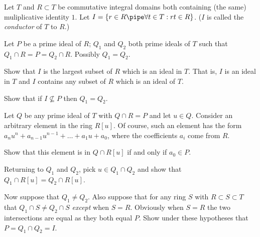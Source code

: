 Let $T$ and $R\subset T$ be commutative integral domains both
containing (the same) muliplicative identity $1$. Let $I=\{r\in R\pipe
\forall t\in T: rt\in R\}$. ($I$ is called the \emph{conductor} of $T$
to $R$.)

Let $P$ be a prime ideal of $R$; $Q_1$ and $Q_2$ both prime ideals of
$T$ such that $Q_1\cap R=P=Q_2\cap R$. Possibly $Q_1=Q_2$.
\begin{alist}
\item Show that $I$ is the largest subset of $R$ which is an ideal in
$T$. That is, $I$ is an ideal in $T$ and $I$ contains any subset of
$R$ which is an ideal of $T$.
\item Show that if $I\nsubseteq P$ then $Q_1=Q_2$.
\item Let $Q$ be any prime ideal of $T$ with $Q\cap R=P$ and let $u\in
Q$. Consider an arbitrary element in the ring $R[u]$. Of course, such
an element has the form $a_nu^n+a_{n-1}u^{n-1}+\ldots +a_1u+a_0$,
where the coefficients $a_i$ come from $R$. 

Show that this element is in $Q\cap R[u]$ if and only if $a_0\in P$.
\item Returning to $Q_1$ and $Q_2$, pick $u\in Q_1\cap Q_2$ and show
that $Q_1\cap R[u]=Q_2\cap R[u]$.
\item Now suppose that $Q_1\neq Q_2$. Also suppose that for any ring
$S$ with $R\subset S\subset T$ that $Q_1\cap S\neq Q_2\cap S$
\emph{except} when $S=R$. Obviously when $S=R$ the two intersections
are equal as they both equal $P$. Show under these hypotheses that
$P=Q_1\cap Q_2=I$.
\end{alist}
